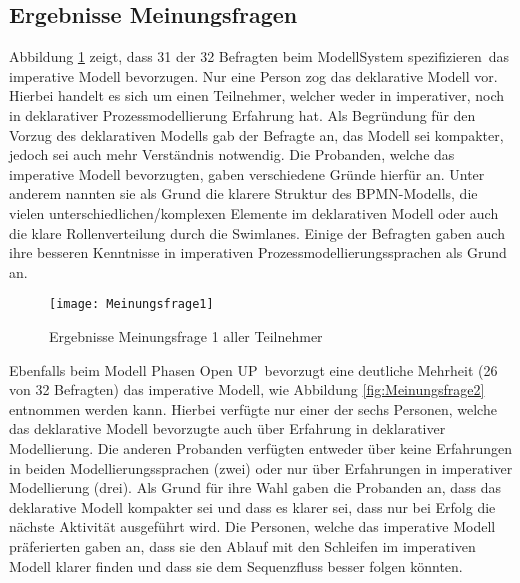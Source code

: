 \subsection{Ergebnisse Meinungsfragen}

Abbildung \ref{fig:Meinungsfrage1} zeigt, dass 31 der 32 Befragten beim Modell\grqq System spezifizieren\grqq \ das imperative Modell bevorzugen. Nur eine Person zog das deklarative Modell vor. Hierbei handelt es sich um einen Teilnehmer, welcher weder in imperativer, noch in deklarativer Prozessmodellierung Erfahrung hat. Als Begründung für den Vorzug des deklarativen Modells gab der Befragte an, das Modell sei kompakter, jedoch sei auch mehr Verständnis notwendig.\newline
Die Probanden, welche das imperative Modell bevorzugten, gaben verschiedene Gründe hierfür an. Unter anderem nannten sie als Grund die klarere Struktur des BPMN-Modells, die vielen unterschiedlichen/komplexen Elemente im deklarativen Modell oder auch die klare Rollenverteilung durch die Swimlanes. Einige der Befragten gaben auch ihre besseren Kenntnisse in imperativen Prozessmodellierungssprachen als Grund an.\newline

\begin{figure}[htp]
\begin{center}
  \texttt{[image: Meinungsfrage1]} %
  \caption{Ergebnisse Meinungsfrage 1 aller Teilnehmer}
  \label{fig:Meinungsfrage1}
\end{center}
\end{figure}

Ebenfalls beim Modell \grqq Phasen Open UP\grqq \ bevorzugt eine deutliche Mehrheit (26 von 32 Befragten) das imperative Modell, wie Abbildung \ref{fig:Meinungsfrage2} entnommen werden kann. \newline
Hierbei verfügte nur einer der sechs Personen, welche das deklarative Modell bevorzugte auch über Erfahrung in deklarativer Modellierung. Die anderen Probanden verfügten entweder über keine Erfahrungen in beiden Modellierungssprachen (zwei) oder nur über Erfahrungen in imperativer Modellierung (drei). Als Grund für ihre Wahl gaben die Probanden an, dass das deklarative Modell kompakter sei und dass es klarer sei, dass nur bei Erfolg die nächste Aktivität ausgeführt wird.\newline
Die Personen, welche das imperative Modell präferierten gaben an, dass sie den Ablauf mit den Schleifen im imperativen Modell klarer finden und dass sie dem Sequenzfluss besser folgen könnten.\newline


